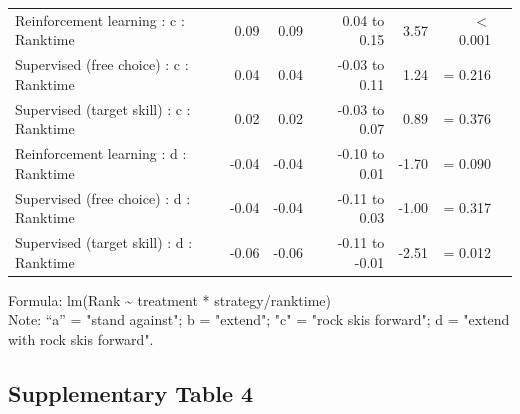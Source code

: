 \documentclass{article}
\begin{document}
\begin{longtable}{lrrrrrl}
Reinforcement learning : c : Ranktime & 0.09 & 0.09 & 0.04 to 0.15 & 3.57 &  $<$  0.001 \\ 
Supervised (free choice) : c : Ranktime & 0.04 & 0.04 & -0.03 to 0.11 & 1.24 &  =  0.216 \\ 
Supervised (target skill) : c : Ranktime & 0.02 & 0.02 & -0.03 to 0.07 & 0.89 &  =  0.376 \\ 
Reinforcement learning : d : Ranktime & -0.04 & -0.04 & -0.10 to 0.01 & -1.70 &  =  0.090 \\ 
Supervised (free choice) : d : Ranktime & -0.04 & -0.04 & -0.11 to 0.03 & -1.00 &  =  0.317 \\ 
Supervised (target skill) : d : Ranktime & -0.06 & -0.06 & -0.11 to -0.01 & -2.51 &  =  0.012 \\ 
\bottomrule
\end{longtable}
\begin{minipage}{\linewidth}
Formula: lm(Rank \textasciitilde{} treatment * strategy/ranktime)\\
Note: “a” = "stand against"; b = "extend"; "c" = "rock skis forward"; d = "extend with rock skis forward". 
\end{minipage}


\subsection{Supplementary Table 4}\label{Supplementarytable_ranking_4}
\end{document}
